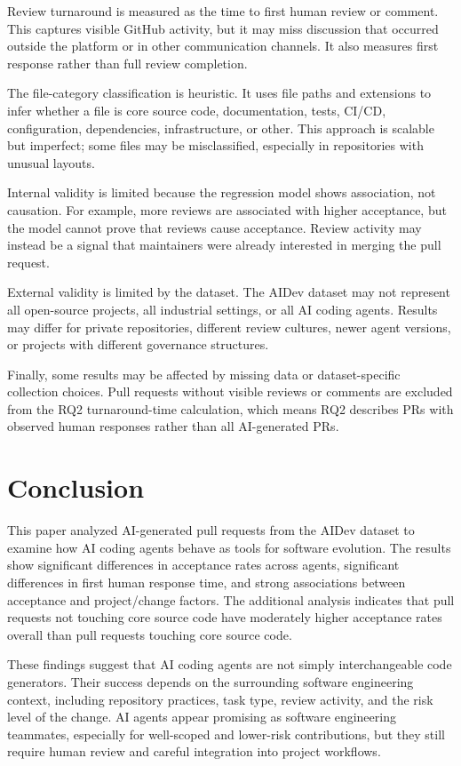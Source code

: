\documentclass[sigconf,nonacm]{acmart}
\begin{document}
Review turnaround is measured as the time to first human review or comment. This captures visible GitHub activity, but it may miss discussion that occurred outside the platform or in other communication channels. It also measures first response rather than full review completion.

The file-category classification is heuristic. It uses file paths and extensions to infer whether a file is core source code, documentation, tests, CI/CD, configuration, dependencies, infrastructure, or other. This approach is scalable but imperfect; some files may be misclassified, especially in repositories with unusual layouts.

Internal validity is limited because the regression model shows association, not causation. For example, more reviews are associated with higher acceptance, but the model cannot prove that reviews cause acceptance. Review activity may instead be a signal that maintainers were already interested in merging the pull request.

External validity is limited by the dataset. The AIDev dataset may not represent all open-source projects, all industrial settings, or all AI coding agents. Results may differ for private repositories, different review cultures, newer agent versions, or projects with different governance structures.

Finally, some results may be affected by missing data or dataset-specific collection choices. Pull requests without visible reviews or comments are excluded from the RQ2 turnaround-time calculation, which means RQ2 describes PRs with observed human responses rather than all AI-generated PRs.

\section{Conclusion}

This paper analyzed AI-generated pull requests from the AIDev dataset to examine how AI coding agents behave as tools for software evolution. The results show significant differences in acceptance rates across agents, significant differences in first human response time, and strong associations between acceptance and project/change factors. The additional analysis indicates that pull requests not touching core source code have moderately higher acceptance rates overall than pull requests touching core source code.

These findings suggest that AI coding agents are not simply interchangeable code generators. Their success depends on the surrounding software engineering context, including repository practices, task type, review activity, and the risk level of the change. AI agents appear promising as software engineering teammates, especially for well-scoped and lower-risk contributions, but they still require human review and careful integration into project workflows.
\end{document}
